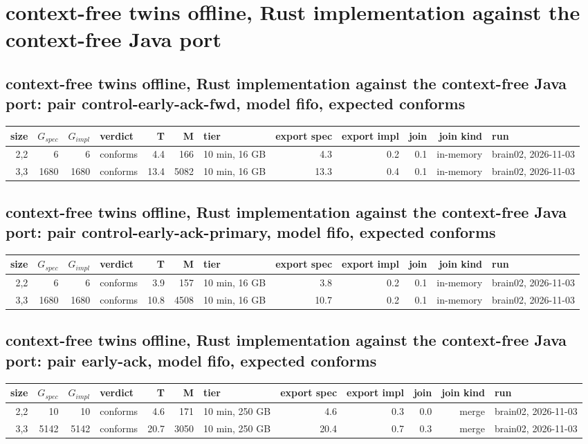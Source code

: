 \documentclass[10pt]{article}
\begin{document}
\section*{context-free twins offline, Rust implementation against the context-free Java port}
\subsection*{context-free twins offline, Rust implementation against the context-free Java port: pair \textsf{control-early-ack-fwd}, model fifo, expected conforms}
\begin{longtable}{@{}rrrlrrlrrrrl@{}}
\toprule
size & $G_{\mathit{spec}}$ & $G_{\mathit{impl}}$ & verdict & T & M & tier & export spec & export impl & join & join kind & run \\
\midrule
\endhead
\color{red} 2,2 & 6 & 6 & conforms & 4.4 & 166 & 10 min, 16 GB & 4.3 & 0.2 & 0.1 & in-memory & brain02, 2026-11-03 \\
\color{red} 3,3 & 1680 & 1680 & conforms & 13.4 & 5082 & 10 min, 16 GB & 13.3 & 0.4 & 0.1 & in-memory & brain02, 2026-11-03 \\
\bottomrule
\end{longtable}
\subsection*{context-free twins offline, Rust implementation against the context-free Java port: pair \textsf{control-early-ack-primary}, model fifo, expected conforms}
\begin{longtable}{@{}rrrlrrlrrrrl@{}}
\toprule
size & $G_{\mathit{spec}}$ & $G_{\mathit{impl}}$ & verdict & T & M & tier & export spec & export impl & join & join kind & run \\
\midrule
\endhead
\color{red} 2,2 & 6 & 6 & conforms & 3.9 & 157 & 10 min, 16 GB & 3.8 & 0.2 & 0.1 & in-memory & brain02, 2026-11-03 \\
\color{red} 3,3 & 1680 & 1680 & conforms & 10.8 & 4508 & 10 min, 16 GB & 10.7 & 0.2 & 0.1 & in-memory & brain02, 2026-11-03 \\
\bottomrule
\end{longtable}
\subsection*{context-free twins offline, Rust implementation against the context-free Java port: pair \textsf{early-ack}, model fifo, expected conforms}
\begin{longtable}{@{}rrrlrrlrrrrl@{}}
\toprule
size & $G_{\mathit{spec}}$ & $G_{\mathit{impl}}$ & verdict & T & M & tier & export spec & export impl & join & join kind & run \\
\midrule
\endhead
\color{blue} 2,2 & 10 & 10 & conforms & 4.6 & 171 & 10 min, 250 GB & 4.6 & 0.3 & 0.0 & merge & brain02, 2026-11-03 \\
\color{blue} 3,3 & 5142 & 5142 & conforms & 20.7 & 3050 & 10 min, 250 GB & 20.4 & 0.7 & 0.3 & merge & brain02, 2026-11-03 \\
\bottomrule
\end{longtable}
\end{document}
